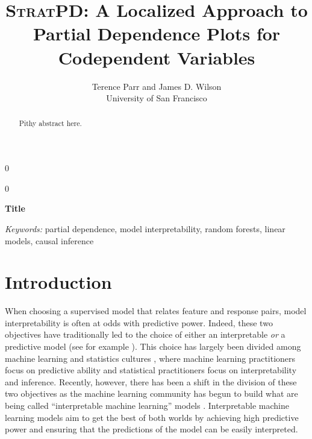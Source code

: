 \documentclass[12pt]{article}
\newcommand{\blind}{0}
\begin{document}
\def\spacingset#1{\renewcommand{\baselinestretch}%
{#1}\small\normalsize} \spacingset{1}



\blind
{
  \title{{\textsc{StratPD}}: \bf A Localized Approach to Partial Dependence Plots for Codependent Variables}

  \author{Terence Parr and James D. Wilson\\
      University of San Francisco\\
}
  \maketitle
} \fi

\blind
{
  \bigskip
  \bigskip
  \bigskip
  \begin{center}
    {\LARGE\bf Title}
\end{center}
  \medskip
} \fi

\bigskip
\begin{abstract}
Pithy abstract here.
\end{abstract}

\noindent%
{\it Keywords:} partial dependence, model interpretability, random forests, linear models, causal inference

\section{Introduction}
\label{sec:intro}

When choosing a supervised model that relates feature and response pairs, model interpretability is often at odds with predictive power. Indeed, these two objectives have traditionally led to the choice of either an interpretable \emph{or} a predictive model (see for example \cite{shmueli2010explain}). This choice has largely been divided among machine learning and statistics cultures \citep{breiman2001statistical, donoho201750}, where machine learning practitioners focus on predictive ability and statistical practitioners focus on interpretability and inference. Recently, however, there has been a shift in the division of these two objectives as the machine learning community has begun to build what are being called  ``interpretable machine learning'' models \citep{doshi2017towards, vellido2012making}. Interpretable machine learning models aim to get the best of both worlds by achieving high predictive power and ensuring that the predictions of the model can be easily interpreted. 
\end{document}
